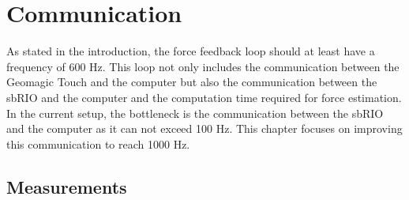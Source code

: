 \chapter{Communication}\label{cha:communication}

As stated in the introduction, the force feedback loop should at least have a frequency of 600 Hz. This loop not only includes the communication between the Geomagic Touch and the computer but also the communication between the sbRIO and the computer and the computation time required for force estimation. In the current setup, the bottleneck is the communication between the sbRIO and the computer as it can not exceed 100 Hz. This chapter focuses on improving this communication to reach 1000 Hz.











\section{Measurements}



